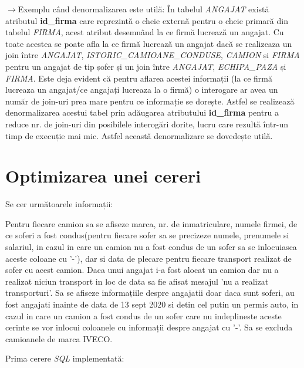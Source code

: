 \documentclass[12pt, a4paper]{article}
\begin{document}
$\rightarrow$Exemplu când denormalizarea este utilă:
În tabelul \emph{ANGAJAT} există atributul \textbf{id\_firma} care reprezintă o cheie externă pentru o cheie primară din tabelul \emph{FIRMA}, acest atribut desemnând la ce firmă lucrează un angajat. Cu toate acestea se poate afla la ce firmă lucrează un angajat dacă se realizeaza un join între \emph{ANGAJAT}, \emph{ISTORIC\_CAMIOANE\_CONDUSE}, \emph{CAMION} și \emph{FIRMA} pentru un angajat de tip șofer și un join între \emph{ANGAJAT}, \emph{ECHIPA\_PAZA} și \emph{FIRMA}. Este deja evident că pentru aflarea acestei informații (la ce firmă lucreaza un angajat/ce angajați lucreaza la o firmă) o interogare ar avea un număr de join-uri prea mare pentru ce informație se dorește. Astfel se realizează denormalizarea acestui tabel prin adăugarea atributului \textbf{id\_firma} pentru a reduce nr. de join-uri din posibilele interogări dorite, lucru care rezultă într-un timp de execuție mai mic. Astfel această denormalizare se dovedește utilă.

\newpage

\newpage
\section{Optimizarea unei cereri}

Se cer următoarele informații:

Pentru fiecare camion sa se afiseze marca, nr. de inmatriculare, numele firmei, de ce soferi a fost condus(pentru fiecare sofer sa se precizeze numele, prenumele si salariul, in cazul in care un camion nu a fost condus de un sofer sa se inlocuiasca aceste coloane cu '-'), dar si data de plecare pentru fiecare transport realizat de sofer cu acest camion. Daca unui angajat i-a fost alocat un camion dar nu a realizat niciun transport in loc de data sa fie afisat mesajul 'nu a realizat transporturi'. Sa se afiseze informațiile despre angajatii doar daca sunt soferi, au fost angajati inainte de data de 13 sept 2020 si detin cel putin un permis auto, in cazul in care un camion a fost condus de un sofer care nu indeplineste aceste cerinte se vor inlocui coloanele cu informații despre angajat cu '-'. Sa se excluda camioanele de marca IVECO.

Prima cerere \emph{SQL} implementată:
\end{document}
